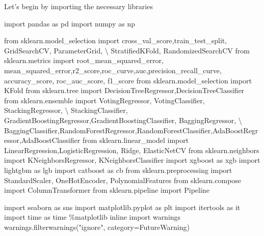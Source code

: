 \documentclass[
  letterpaper,
  DIV=11,
  numbers=noendperiod]{scrreprt}
\newenvironment{Shaded}{\begin{snugshade}}{\end{snugshade}}
\newcommand{\ImportTok}[1]{\textcolor[rgb]{0.00,0.46,0.62}{#1}}
\newcommand{\NormalTok}[1]{\textcolor[rgb]{0.00,0.23,0.31}{#1}}
\newcommand{\OperatorTok}[1]{\textcolor[rgb]{0.37,0.37,0.37}{#1}}
\newcommand{\PreprocessorTok}[1]{\textcolor[rgb]{0.68,0.00,0.00}{#1}}
\newcommand{\StringTok}[1]{\textcolor[rgb]{0.13,0.47,0.30}{#1}}
\begin{document}
Let's begin by importing the necessary libraries

\begin{Shaded}
\begin{Highlighting}[]
\ImportTok{import}\NormalTok{ pandas }\ImportTok{as}\NormalTok{ pd}
\ImportTok{import}\NormalTok{ numpy }\ImportTok{as}\NormalTok{ np}

\ImportTok{from}\NormalTok{ sklearn.model\_selection }\ImportTok{import}\NormalTok{ cross\_val\_score,train\_test\_split, GridSearchCV, ParameterGrid, }\OperatorTok{\textbackslash{}}
\NormalTok{StratifiedKFold, RandomizedSearchCV}
\ImportTok{from}\NormalTok{ sklearn.metrics }\ImportTok{import}\NormalTok{ root\_mean\_squared\_error, mean\_squared\_error,r2\_score,roc\_curve,auc,precision\_recall\_curve, accuracy\_score, roc\_auc\_score, f1\_score}
\ImportTok{from}\NormalTok{ sklearn.model\_selection }\ImportTok{import}\NormalTok{ KFold}
\ImportTok{from}\NormalTok{ sklearn.tree }\ImportTok{import}\NormalTok{ DecisionTreeRegressor,DecisionTreeClassifier}
\ImportTok{from}\NormalTok{ sklearn.ensemble }\ImportTok{import}\NormalTok{ VotingRegressor, VotingClassifier, StackingRegressor, }\OperatorTok{\textbackslash{}}
\NormalTok{StackingClassifier, GradientBoostingRegressor,GradientBoostingClassifier, BaggingRegressor, }\OperatorTok{\textbackslash{}}
\NormalTok{BaggingClassifier,RandomForestRegressor,RandomForestClassifier,AdaBoostRegressor,AdaBoostClassifier}
\ImportTok{from}\NormalTok{ sklearn.linear\_model }\ImportTok{import}\NormalTok{ LinearRegression,LogisticRegression, Ridge, ElasticNetCV}
\ImportTok{from}\NormalTok{ sklearn.neighbors }\ImportTok{import}\NormalTok{ KNeighborsRegressor, KNeighborsClassifier}
\ImportTok{import}\NormalTok{ xgboost }\ImportTok{as}\NormalTok{ xgb}
\ImportTok{import}\NormalTok{ lightgbm }\ImportTok{as}\NormalTok{ lgb}
\ImportTok{import}\NormalTok{ catboost }\ImportTok{as}\NormalTok{ cb}
\ImportTok{from}\NormalTok{ sklearn.preprocessing }\ImportTok{import}\NormalTok{ StandardScaler, OneHotEncoder, PolynomialFeatures}
\ImportTok{from}\NormalTok{ sklearn.compose }\ImportTok{import}\NormalTok{ ColumnTransformer}
\ImportTok{from}\NormalTok{ sklearn.pipeline }\ImportTok{import}\NormalTok{ Pipeline}

\ImportTok{import}\NormalTok{ seaborn }\ImportTok{as}\NormalTok{ sns}
\ImportTok{import}\NormalTok{ matplotlib.pyplot }\ImportTok{as}\NormalTok{ plt}
\ImportTok{import}\NormalTok{ itertools }\ImportTok{as}\NormalTok{ it}
\ImportTok{import}\NormalTok{ time }\ImportTok{as}\NormalTok{ time}
\OperatorTok{\%}\NormalTok{matplotlib inline}
\ImportTok{import}\NormalTok{ warnings}
\NormalTok{warnings.filterwarnings(}\StringTok{"ignore"}\NormalTok{, category}\OperatorTok{=}\PreprocessorTok{FutureWarning}\NormalTok{)}
\end{Highlighting}
\end{Shaded}
\end{document}

